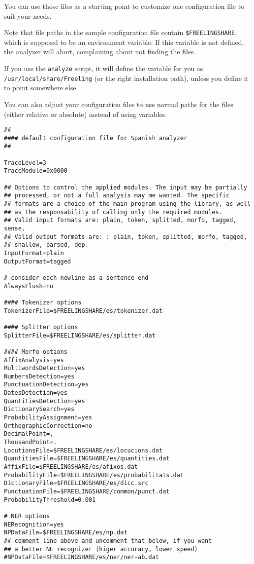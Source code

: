 \documentclass[a4paper]{book}
\begin{document}
  You can use those files as a starting point to customize 
  one configuration file to suit your needs.

  Note that file paths in the sample configuration file contain
  \verb#$FREELINGSHARE#, which is supposed to be an environment
  variable.  If this variable is not defined, the analyzer will
  abort, complaining about not finding the files.

  If you use the {\tt analyze} script, it will define the variable for
  you as {\tt /usr/local/share/Freeling} (or the right installation
  path), unless you define it to point somewhere else.

  You can also adjust your configuration files to use normal paths for
  the files (either relative or absolute) instead of using variables.

{\small
\begin{verbatim}
##
#### default configuration file for Spanish analyzer
##

TraceLevel=3
TraceModule=0x0000

## Options to control the applied modules. The input may be partially
## processed, or not a full analysis may me wanted. The specific
## formats are a choice of the main program using the library, as well
## as the responsability of calling only the required modules.  
## Valid input formats are: plain, token, splitted, morfo, tagged, sense.
## Valid output formats are: : plain, token, splitted, morfo, tagged,
## shallow, parsed, dep.
InputFormat=plain
OutputFormat=tagged

# consider each newline as a sentence end
AlwaysFlush=no

#### Tokenizer options
TokenizerFile=$FREELINGSHARE/es/tokenizer.dat

#### Splitter options
SplitterFile=$FREELINGSHARE/es/splitter.dat

#### Morfo options
AffixAnalysis=yes
MultiwordsDetection=yes
NumbersDetection=yes
PunctuationDetection=yes
DatesDetection=yes
QuantitiesDetection=yes
DictionarySearch=yes
ProbabilityAssignment=yes
OrthographicCorrection=no
DecimalPoint=,
ThousandPoint=.
LocutionsFile=$FREELINGSHARE/es/locucions.dat 
QuantitiesFile=$FREELINGSHARE/es/quantities.dat
AffixFile=$FREELINGSHARE/es/afixos.dat
ProbabilityFile=$FREELINGSHARE/es/probabilitats.dat
DictionaryFile=$FREELINGSHARE/es/dicc.src
PunctuationFile=$FREELINGSHARE/common/punct.dat
ProbabilityThreshold=0.001

# NER options 
NERecognition=yes
NPDataFile=$FREELINGSHARE/es/np.dat
## comment line above and uncomment that below, if you want 
## a better NE recognizer (higer accuracy, lower speed)
#NPDataFile=$FREELINGSHARE/es/ner/ner-ab.dat


\end{verbatim}}
\end{document}
